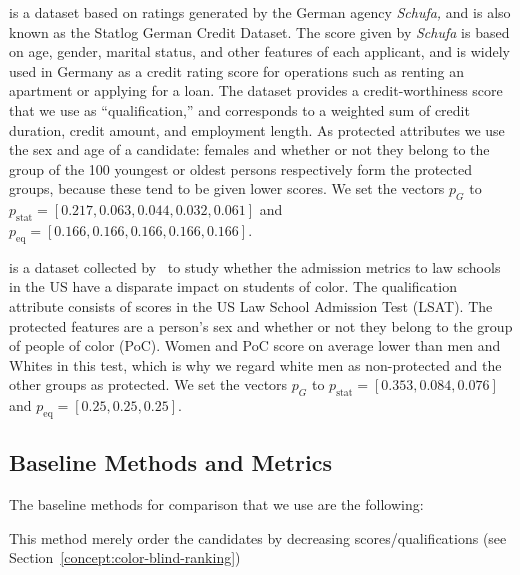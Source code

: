  is a dataset based on ratings generated by the German agency \emph{Schufa,} and is also known as the Statlog German Credit Dataset.
%
The score given by \emph{Schufa} is based on age, gender, marital status, and other features of each applicant, and is widely used in Germany as a credit rating score for operations such as renting an apartment or applying for a loan.
%
The dataset provides a credit-worthiness score that we use as ``qualification,'' and corresponds to a weighted sum of credit duration, credit amount, and employment length.
%
As protected attributes we use the sex and age of a candidate: females and whether or not they belong to the group of the 100 youngest or oldest persons respectively form the protected groups, because these tend to be given lower scores.
%
We set the vectors $p_G$ to $p_{\text{stat}}=[0.217,0.063,0.044,0.032,0.061]$ and $p_{\text{eq}}=[0.166,0.166,0.166,0.166,0.166]$.


 is a dataset collected by~\citet{wightman1998lsac} to study whether the admission metrics to law schools in the US have a disparate impact on students of color.
%
The qualification attribute consists of scores in the US Law School Admission Test (LSAT).
%
The protected features are a person's sex and whether or not they belong to the group of people of color (PoC).
%
Women and PoC score on average lower than men and Whites in this test, which is why we regard white men as non-protected and the other groups as protected.
%
We set the vectors $p_G$ to $p_{\text{stat}}=[0.353,0.084,0.076]$ and $p_{\text{eq}}=[0.25,0.25,0.25]$.


\subsection{Baseline Methods and Metrics}\label{sec:experiments-baselines}

The baseline methods for comparison that we use are the following:

 This method merely order the candidates by decreasing scores/qualifications (see Section~\ref{concept:color-blind-ranking}) 

